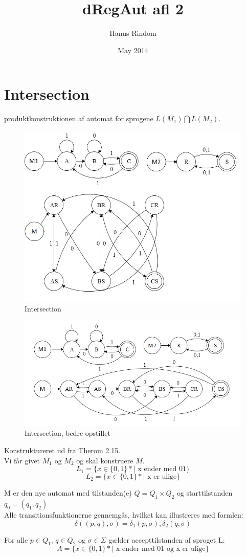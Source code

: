 \documentclass{article}
\title{dRegAut afl 2}
\author{Hanus Rindom}
\date{May 2014}
\begin{document}
\maketitle

\section{Intersection}
produktkonstruktionen af automat for sprogene $ L(M_1) \bigcap L(M_2) $.
\begin{figure}[h]
    \caption{Intersection}
        \includegraphics[width=1\textwidth]{download}
\end{figure}

\begin{figure}[h]
    \caption{Intersection, bedre opstillet}
        \includegraphics[width=1\textwidth]{download2}
\end{figure}
Konstruktureret ud fra Therom 2.15.\\
Vi får givet $ M_1 $ og $ M_2 $ og skal konstruere $ M $.\\
$$ L_1= \{ x \in \{ 0,1 \}* | \text{ x ender med 01} \} $$
$$ L_2= \{ x \in \{ 0,1 \}* | \text{ x er ulige} \} $$

M er den nye automat med tilstanden(e) $ Q=Q_1 \times Q_2 $ og starttilstanden $ q_0 = (q_1 , q_2) $\\

Alle transitionsfunktionerne gennemgås, hvilket kan illustreres med formlen:
$$ \delta((p,q), \sigma) = \delta _1 (p, \sigma), \delta _2 (q , \sigma) $$

For alle $ p \in Q_1 $, $ q \in Q_2 $ og $ \sigma \in \Sigma $ gælder accepttilstanden af sproget L:
$$ A= \{ x \in \{ 0,1 \}* | \text{ x ender med 01 og x er ulige} \} $$
\end{document}
